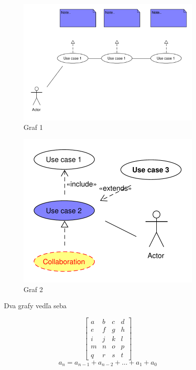 \documentclass[10pt,twocolumn,twoside,slovak,a4paper]{article}
\begin{document}
\begin{figure}[h!]
\centering
\begin{subfigure}{.45\textwidth}
  \centering
  \includegraphics[width=\linewidth]{graf1.pdf} %
  \caption{Graf 1}
\end{subfigure}%
\hfill
\begin{subfigure}{.45\textwidth}
  \centering
  \includegraphics[width=\linewidth]{graf2.pdf} %
  \caption{Graf 2}
\end{subfigure}
\caption{Dva grafy vedľa seba}
\end{figure}

\[
\begin{bmatrix}
a & b & c & d \\
e & f & g & h \\
i & j & k & l \\
m & n & o & p \\
q & r & s & t
\end{bmatrix}
\]
\[
a_n = a_{n-1} + a_{n-2} + \dots + a_1 + a_0
\]
\end{document}
